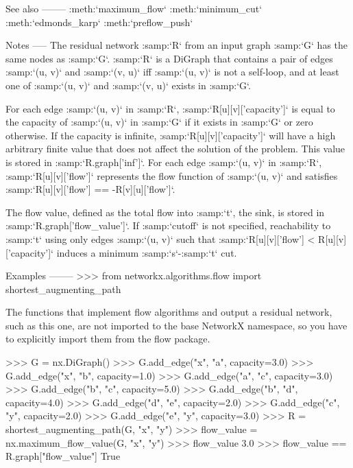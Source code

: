 \begin{DoxyVerb}
See also
--------
:meth:`maximum_flow`
:meth:`minimum_cut`
:meth:`edmonds_karp`
:meth:`preflow_push`

Notes
-----
The residual network :samp:`R` from an input graph :samp:`G` has the
same nodes as :samp:`G`. :samp:`R` is a DiGraph that contains a pair
of edges :samp:`(u, v)` and :samp:`(v, u)` iff :samp:`(u, v)` is not a
self-loop, and at least one of :samp:`(u, v)` and :samp:`(v, u)` exists
in :samp:`G`.

For each edge :samp:`(u, v)` in :samp:`R`, :samp:`R[u][v]['capacity']`
is equal to the capacity of :samp:`(u, v)` in :samp:`G` if it exists
in :samp:`G` or zero otherwise. If the capacity is infinite,
:samp:`R[u][v]['capacity']` will have a high arbitrary finite value
that does not affect the solution of the problem. This value is stored in
:samp:`R.graph['inf']`. For each edge :samp:`(u, v)` in :samp:`R`,
:samp:`R[u][v]['flow']` represents the flow function of :samp:`(u, v)` and
satisfies :samp:`R[u][v]['flow'] == -R[v][u]['flow']`.

The flow value, defined as the total flow into :samp:`t`, the sink, is
stored in :samp:`R.graph['flow_value']`. If :samp:`cutoff` is not
specified, reachability to :samp:`t` using only edges :samp:`(u, v)` such
that :samp:`R[u][v]['flow'] < R[u][v]['capacity']` induces a minimum
:samp:`s`-:samp:`t` cut.

Examples
--------
>>> from networkx.algorithms.flow import shortest_augmenting_path

The functions that implement flow algorithms and output a residual
network, such as this one, are not imported to the base NetworkX
namespace, so you have to explicitly import them from the flow package.

>>> G = nx.DiGraph()
>>> G.add_edge("x", "a", capacity=3.0)
>>> G.add_edge("x", "b", capacity=1.0)
>>> G.add_edge("a", "c", capacity=3.0)
>>> G.add_edge("b", "c", capacity=5.0)
>>> G.add_edge("b", "d", capacity=4.0)
>>> G.add_edge("d", "e", capacity=2.0)
>>> G.add_edge("c", "y", capacity=2.0)
>>> G.add_edge("e", "y", capacity=3.0)
>>> R = shortest_augmenting_path(G, "x", "y")
>>> flow_value = nx.maximum_flow_value(G, "x", "y")
>>> flow_value
3.0
>>> flow_value == R.graph["flow_value"]
True\end{DoxyVerb}
 \mbox{\label{namespacenetworkx_1_1algorithms_1_1flow_1_1shortestaugmentingpath_acea06dbc2978d31684e57339d848f8e0}} 

